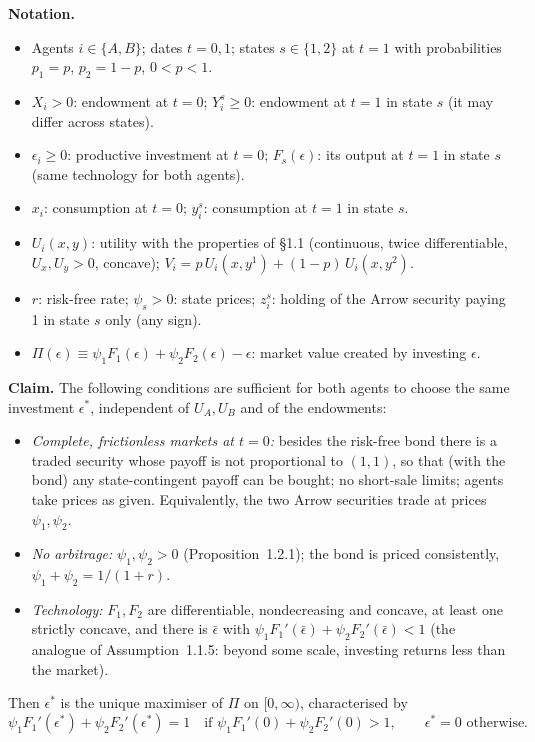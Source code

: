\documentclass[11pt,a4paper]{article}
\numberwithin{equation}{section}
\newenvironment{notation}{\par\noindent\textbf{Notation.}\begin{itemize}[leftmargin=1.4em]}{\end{itemize}}
\begin{document}
\begin{notation}
  \item Agents $i\in\{A,B\}$; dates $t=0,1$; states $s\in\{1,2\}$ at $t=1$ with probabilities $p_1=p$, $p_2=1-p$, $0<p<1$.
  \item $X_i>0$: endowment at $t=0$; $Y_i^s\ge0$: endowment at $t=1$ in state $s$ (it may differ across states).
  \item $\epsilon_i\ge0$: productive investment at $t=0$; $F_s(\epsilon)$: its output at $t=1$ in state $s$ (same technology for both agents).
  \item $x_i$: consumption at $t=0$; $y_i^s$: consumption at $t=1$ in state $s$.
  \item $U_i(x,y)$: utility with the properties of \S1.1 (continuous, twice differentiable, $U_x,U_y>0$, concave);
        $V_i=p\,U_i(x,y^1)+(1-p)\,U_i(x,y^2)$.
  \item $r$: risk-free rate; $\psi_s>0$: state prices; $z_i^s$: holding of the Arrow security paying 1 in state $s$ only (any sign).
  \item $\Pi(\epsilon)\equiv\psi_1F_1(\epsilon)+\psi_2F_2(\epsilon)-\epsilon$: market value created by investing $\epsilon$.
\end{notation}

\noindent\textbf{Claim.} The following conditions are sufficient for both agents to choose the
same investment $\epsilon^\ast$, independent of $U_A,U_B$ and of the endowments:
\begin{itemize}[leftmargin=2.2em]
  \item[(S1)] \emph{Complete, frictionless markets at $t=0$:} besides the risk-free bond there
  is a traded security whose payoff is not proportional to $(1,1)$, so that (with the bond)
  any state-contingent payoff can be bought; no short-sale limits; agents take prices as given.
  Equivalently, the two Arrow securities trade at prices $\psi_1,\psi_2$.
  \item[(S2)] \emph{No arbitrage:} $\psi_1,\psi_2>0$ (Proposition~1.2.1); the bond is priced
  consistently, $\psi_1+\psi_2=1/(1+r)$.
  \item[(S3)] \emph{Technology:} $F_1,F_2$ are differentiable, nondecreasing and concave, at least
  one strictly concave, and there is $\bar\epsilon$ with $\psi_1F_1'(\bar\epsilon)+\psi_2F_2'(\bar\epsilon)<1$
  (the analogue of Assumption~1.1.5: beyond some scale, investing returns less than the market).
\end{itemize}
Then $\epsilon^\ast$ is the unique maximiser of $\Pi$ on $[0,\infty)$, characterised by
\begin{equation}\label{eq:15foc}
  \psi_1F_1'(\epsilon^\ast)+\psi_2F_2'(\epsilon^\ast)=1 \quad\text{if } \psi_1F_1'(0)+\psi_2F_2'(0)>1,
  \qquad \epsilon^\ast=0 \text{ otherwise.}
\end{equation}
\end{document}
